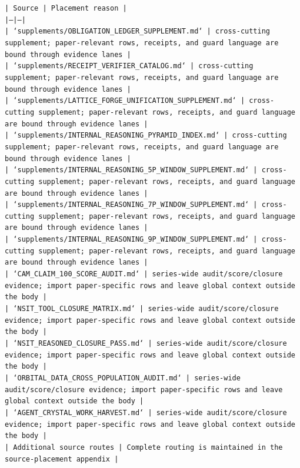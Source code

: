 \documentclass[11pt]{article}
\begin{document}
\noindent\texttt{| Source | Placement reason |}\\
\noindent\texttt{|---|---|}\\
\noindent\texttt{| `supplements/OBLIGATION\_LEDGER\_SUPPLEMENT.md` | cross-cutting supplement; paper-relevant rows, receipts, and guard language are bound through evidence lanes |}\\
\noindent\texttt{| `supplements/RECEIPT\_VERIFIER\_CATALOG.md` | cross-cutting supplement; paper-relevant rows, receipts, and guard language are bound through evidence lanes |}\\
\noindent\texttt{| `supplements/LATTICE\_FORGE\_UNIFICATION\_SUPPLEMENT.md` | cross-cutting supplement; paper-relevant rows, receipts, and guard language are bound through evidence lanes |}\\
\noindent\texttt{| `supplements/INTERNAL\_REASONING\_PYRAMID\_INDEX.md` | cross-cutting supplement; paper-relevant rows, receipts, and guard language are bound through evidence lanes |}\\
\noindent\texttt{| `supplements/INTERNAL\_REASONING\_5P\_WINDOW\_SUPPLEMENT.md` | cross-cutting supplement; paper-relevant rows, receipts, and guard language are bound through evidence lanes |}\\
\noindent\texttt{| `supplements/INTERNAL\_REASONING\_7P\_WINDOW\_SUPPLEMENT.md` | cross-cutting supplement; paper-relevant rows, receipts, and guard language are bound through evidence lanes |}\\
\noindent\texttt{| `supplements/INTERNAL\_REASONING\_9P\_WINDOW\_SUPPLEMENT.md` | cross-cutting supplement; paper-relevant rows, receipts, and guard language are bound through evidence lanes |}\\
\noindent\texttt{| `CAM\_CLAIM\_100\_SCORE\_AUDIT.md` | series-wide audit/score/closure evidence; import paper-specific rows and leave global context outside the body |}\\
\noindent\texttt{| `NSIT\_TOOL\_CLOSURE\_MATRIX.md` | series-wide audit/score/closure evidence; import paper-specific rows and leave global context outside the body |}\\
\noindent\texttt{| `NSIT\_REASONED\_CLOSURE\_PASS.md` | series-wide audit/score/closure evidence; import paper-specific rows and leave global context outside the body |}\\
\noindent\texttt{| `ORBITAL\_DATA\_CROSS\_POPULATION\_AUDIT.md` | series-wide audit/score/closure evidence; import paper-specific rows and leave global context outside the body |}\\
\noindent\texttt{| `AGENT\_CRYSTAL\_WORK\_HARVEST.md` | series-wide audit/score/closure evidence; import paper-specific rows and leave global context outside the body |}\\
\noindent\texttt{| Additional source routes | Complete routing is maintained in the source-placement appendix |}\\
\end{document}
